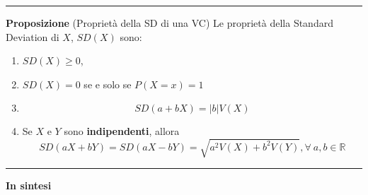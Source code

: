 \documentclass[
  11pt,
]{book}
\providecommand{\tightlist}{%
  \setlength{\itemsep}{0pt}\setlength{\parskip}{0pt}}
\theoremstyle{mytheoremstyle}
\theoremstyle{mydefstyle}
\begin{document}
\begin{center}\rule{0.5\linewidth}{0.5pt}\end{center}

\textbf{Proposizione} (Proprietà della SD di una VC)
Le proprietà della Standard Deviation di \(X\), \(SD(X)\) sono:

\begin{enumerate}
\def\labelenumi{\arabic{enumi}.}
\tightlist
\item
  \(SD(X)\geq 0\),
\item
  \(SD(X)=0\) se e solo se \(P(X=x)=1\)
\item
  \[SD(a+bX)=|b|V(X)\]
\item
  Se \(X\) e \(Y\) sono \textbf{indipendenti}, allora \[SD(aX+bY)=SD(aX-bY)=\sqrt{a^2V(X)+b^2V(Y)}, \forall~a,b\in\mathbb{R}\]
\end{enumerate}

\begin{center}\rule{0.5\linewidth}{0.5pt}\end{center}

\textbf{In sintesi}
\end{document}
